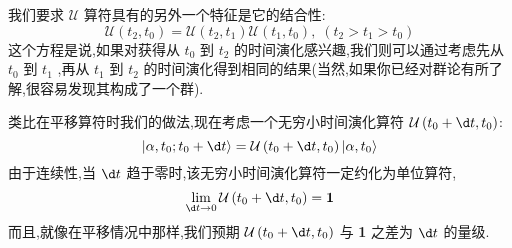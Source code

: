 我们要求 $\mathcal{U}$ 算符具有的另外一个特征是它的结合性:
\begin{equation}\label{2.12}
	\mathcal{U}\left( {{t}_{2},{t}_{0}}\right) = \mathcal{U}\left( {{t}_{2},{t}_{1}}\right) \mathcal{U}\left( {{t}_{1},{t}_{0}}\right) ,\;\left( {{t}_{2} > {t}_{1} > {t}_{0}}\right)
\end{equation}
这个方程是说,如果对获得从 ${t}_{0}$ 到 ${t}_{2}$ 的时间演化感兴趣,我们则可以通过考虑先从 ${t}_{0}$ 到 ${t}_{1}$ ,再从 ${t}_{1}$ 到 ${t}_{2}$ 的时间演化得到相同的结果(当然,如果你已经对群论有所了解,很容易发现其构成了一个群). 

类比在平移算符时我们的做法,现在考虑一个无穷小时间演化算符 $\mathcal{U}\left( {{t}_{0} + {\d t},{t}_{0}}\right)$:
\begin{equation}
	\left| {\alpha ,{t}_{0};{t}_{0} + {\d t}}\right\rangle = \mathcal{U}\left( {{t}_{0} + {\d t},{t}_{0}}\right) \left| {\alpha ,{t}_{0}}\right\rangle
\end{equation}
由于连续性,当 ${\d t}$ 趋于零时,该无穷小时间演化算符一定约化为单位算符,
\begin{equation}
	\mathop{\lim }\limits_{{{\d t} \rightarrow 0}}\mathcal{U}\left( {{t}_{0} + {\d t},{t}_{0}}\right) = \textbf{1}
\end{equation}
而且,就像在平移情况中那样,我们预期 $\mathcal{U}\left( {{t}_{0} + {\d t},{t}_{0}}\right)$ 与 \textbf{1} 之差为 ${\d t}$ 的量级.

